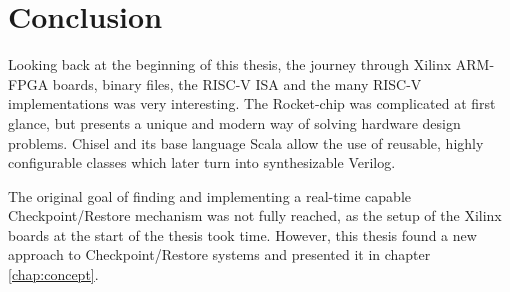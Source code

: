 \chapter{Conclusion}\label{chap:conclusion}
Looking back at the beginning of this thesis, the journey through
Xilinx ARM-FPGA boards, binary files, the RISC-V ISA and the many
RISC-V implementations was very interesting.
The Rocket-chip was complicated at first glance, but
presents a unique and modern way of solving hardware design
problems. Chisel and its base language Scala allow the
use of reusable, highly configurable classes which later turn
into synthesizable Verilog.

The original goal of finding and implementing a real-time capable
Checkpoint/Restore mechanism was not fully reached, as the
setup of the Xilinx boards at the start of the thesis took
time. However, this thesis found a new approach to
Checkpoint/Restore systems and presented it in chapter \ref{chap:concept}.